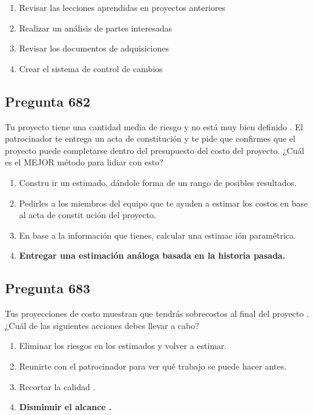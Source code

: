 \documentclass[11pt,a4paper]{article}
\begin{document}
\begin{enumerate}[label=\alph*)]
  \item Revisar las lecciones aprendidas en proyectos anteriores
  \item Realizar un análisis de partes interesadas
  \item Revisar los documentos de adquisiciones
  \item Crear el sistema de control de cambios
\end{enumerate}

\subsection*{Pregunta 682}
Tu proyecto tiene una cantidad media de riesgo y no está muy bien definido . El patrocinador te entrega un acta de constitución y te pide que confirmes que el proyecto puede completarse dentro del presupuesto del costo del proyecto. ¿Cuál es el MEJOR método para lidiar con esto?

\begin{enumerate}[label=\alph*)]
  \item Constru ir un estimado, dándole forma de un rango de posibles resultados.
  \item Pedirles a los miembros del equipo que te ayuden a estimar los costos en base al acta de constit ución del proyecto.
  \item En base a la información que tienes, calcular una estimac ión paramétrica.
  \item \textbf{Entregar una estimación análoga basada en la historia pasada.}
\end{enumerate}

\subsection*{Pregunta 683}
Tus proyecciones de costo muestran que tendrás sobrecostos al final del proyecto . ¿Cuál de las siguientes acciones debes llevar a cabo?

\begin{enumerate}[label=\alph*)]
  \item Eliminar los riesgos en los estimados y volver a estimar.
  \item Reunirte con el patrocinador para ver qué trabajo se puede hacer antes.
  \item Recortar la calidad .
  \item \textbf{Disminuir el alcance .}
\end{enumerate}
\end{document}
